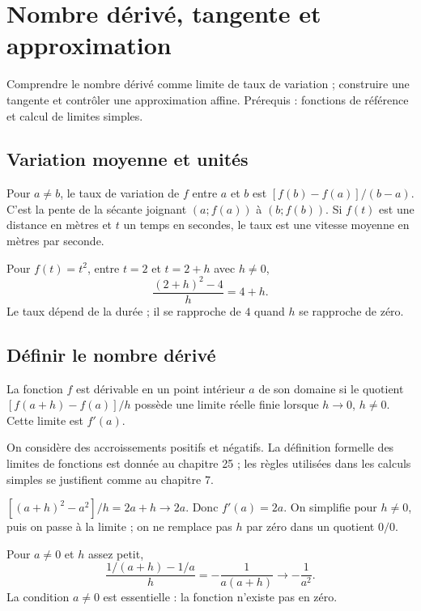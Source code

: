 \documentclass[../cours_1re.tex]{subfiles}
\begin{document}
\setcounter{chapter}{7}
\chapter{Nombre dérivé, tangente et approximation}
\label{ch:08}
\begin{objectif}
Comprendre le nombre dérivé comme limite de taux de variation ; construire une tangente et contrôler une approximation affine. Prérequis : fonctions de référence et calcul de limites simples.
\end{objectif}
\section{Variation moyenne et unités}
Pour $a\ne b$, le taux de variation de $f$ entre $a$ et $b$ est
$[f(b)-f(a)]/(b-a)$.
C'est la pente de la sécante joignant $(a;f(a))$ à $(b;f(b))$.
Si $f(t)$ est une distance en mètres et $t$ un temps en secondes, le taux est une vitesse moyenne en mètres par seconde.
\begin{exemple}
Pour $f(t)=t^2$, entre $t=2$ et $t=2+h$ avec $h\ne0$,
\[
\frac{(2+h)^2-4}{h}=4+h.
\]
Le taux dépend de la durée ; il se rapproche de $4$ quand $h$ se rapproche de zéro.
\end{exemple}
\section{Définir le nombre dérivé}
\begin{definition}
La fonction $f$ est dérivable en un point intérieur $a$ de son domaine si le quotient
$[f(a+h)-f(a)]/h$ possède une limite réelle finie lorsque $h\to0$, $h\ne0$.
Cette limite est $f'(a)$.
\end{definition}
On considère des accroissements positifs et négatifs. La définition formelle des limites de fonctions est donnée au chapitre 25 ; les règles utilisées dans les calculs simples se justifient comme au chapitre 7.
\begin{demonstration}
$[(a+h)^2-a^2]/h=2a+h\to2a$. Donc $f'(a)=2a$. On simplifie pour $h\ne0$, puis on passe à la limite ; on ne remplace pas $h$ par zéro dans un quotient $0/0$.
\end{demonstration}
\begin{demonstration}
Pour $a\ne0$ et $h$ assez petit,
\[
\frac{1/(a+h)-1/a}{h}=-\frac1{a(a+h)}\longrightarrow-\frac1{a^2}.
\]
La condition $a\ne0$ est essentielle : la fonction n'existe pas en zéro.
\end{demonstration}
\end{document}
